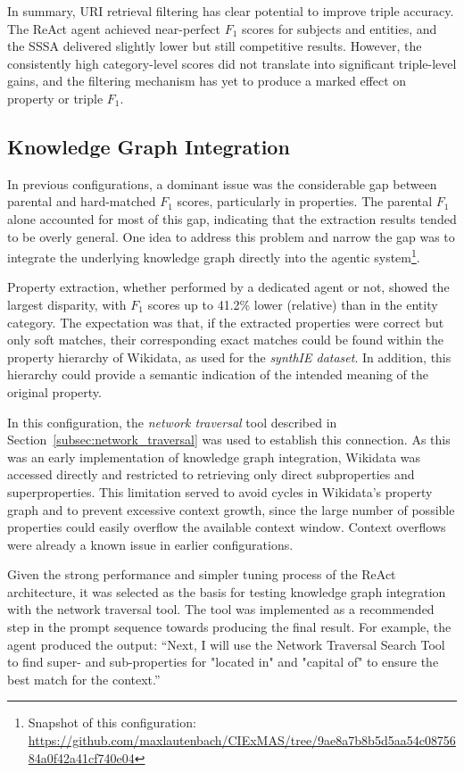 \documentclass[a4paper,oneside,bibliography=totoc]{scrbook}
\begin{document}
In summary, URI retrieval filtering has clear potential to improve triple accuracy. The ReAct agent achieved near-perfect $F_{1}$ scores for subjects and entities, and the \ac{SSSA} delivered slightly lower but still competitive results. However, the consistently high category-level scores did not translate into significant triple-level gains, and the filtering mechanism has yet to produce a marked effect on property or triple $F_{1}$.

\subsection{Knowledge Graph Integration}
\label{subsec:knowledge_graph_integration}

In previous configurations, a dominant issue was the considerable gap between parental and hard-matched $F_{1}$ scores, particularly in properties. The parental $F_{1}$ alone accounted for most of this gap, indicating that the extraction results tended to be overly general. One idea to address this problem and narrow the gap was to integrate the underlying knowledge graph directly into the agentic system\footnote{Snapshot of this configuration: \url{https://github.com/maxlautenbach/CIExMAS/tree/9ae8a7b8b5d5aa54c0875684a0f42a41cf740e04}}.

Property extraction, whether performed by a dedicated agent or not, showed the largest disparity, with $F_{1}$ scores up to 41.2\% lower (relative) than in the entity category. The expectation was that, if the extracted properties were correct but only soft matches, their corresponding exact matches could be found within the property hierarchy of Wikidata, as used for the \textit{synthIE dataset}. In addition, this hierarchy could provide a semantic indication of the intended meaning of the original property.

In this configuration, the \textit{network traversal} tool described in Section~\ref{subsec:network_traversal} was used to establish this connection. As this was an early implementation of knowledge graph integration, Wikidata was accessed directly and restricted to retrieving only direct subproperties and superproperties. This limitation served to avoid cycles in Wikidata’s property graph and to prevent excessive context growth, since the large number of possible properties could easily overflow the available context window. Context overflows were already a known issue in earlier configurations.

Given the strong performance and simpler tuning process of the ReAct architecture, it was selected as the basis for testing knowledge graph integration with the network traversal tool. The tool was implemented as a recommended step in the prompt sequence towards producing the final result. For example, the agent produced the output: \enquote{Next, I will use the Network Traversal Search Tool to find super- and sub-properties for "located in" and "capital of" to ensure the best match for the context.}
\end{document}
